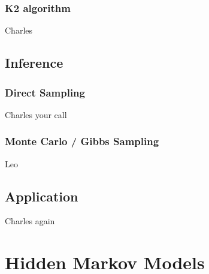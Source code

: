 \documentclass{article}
\begin{document}
\subsubsection{K2 algorithm}
Charles
\subsection{Inference}
\subsubsection{Direct Sampling}
Charles your call
\subsubsection{Monte Carlo / Gibbs Sampling}
Leo
\subsection{Application}
Charles again

\section{Hidden Markov Models}


\onehalfspacing


\end{document}
